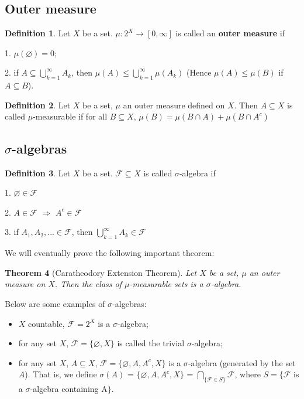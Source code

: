 \documentclass{article}
\newtheorem{theorem}{Theorem}[section]
\theoremstyle{definition}
\newtheorem{definition}[theorem]{Definition}
\begin{document}
\subsection{Outer measure}

\begin{definition}
Let $X$ be a set. $\mu\colon 2^X \longrightarrow [0, \infty]$ is called an {\bf outer measure} if

1. $\mu(\varnothing) = 0$;

2. if $A \subseteq \bigcup_{k=1}^\infty A_k$, then $\mu(A) \leq \bigcup_{k=1}^\infty \mu(A_k)$ (Hence $\mu(A) \leq \mu(B)$ if $A \subseteq B$).
\end{definition}


\begin{definition}
Let $X$ be a set, $\mu$ an outer measure defined on $X$. Then $A \subseteq X$ is called $\mu$-measurable if for all $B \subseteq X$, $\mu(B) = \mu(B \cap A)+\mu(B \cap A^c)$
\end{definition}

\subsection{\texorpdfstring{$\sigma$}{Sigma}-algebras}

\begin{definition}
Let $X$ be a set. $\mathscr{F} \subseteq X$ is called $\sigma$-algebra if 

1. $\varnothing \in \mathscr{F}$

2. $A \in \mathscr{F}$ $\Longrightarrow$ $A^c \in \mathscr{F}$

3. if $A_1, A_2,... \in \mathscr{F}$, then $\bigcup_{k=1}^\infty A_k \in \mathscr{F}$
\end{definition}

We will eventually prove the following important theorem:
\begin{theorem}[Caratheodory Extension Theorem]
Let $X$ be a set, $\mu$ an outer measure on $X$. Then the class of $\mu$-measurable sets is a $\sigma$-algebra.
\end{theorem}


Below are some examples of $\sigma$-algebras:
\begin{itemize}
	\item $X$ countable, $\mathscr{F} = 2^X$ is a $\sigma$-algebra;

    \item for any set $X$, $\mathscr{F} = \{\varnothing, X\}$ is called the trivial $\sigma$-algebra;
    
    \item for any set $X$, $A \subseteq X$, $\mathscr{F} = \{ \varnothing, A, A^c, X\}$ is a $\sigma$-algebra (generated by the set $A$).
    That is, we define $\sigma(A)$ = $\{\varnothing, A, A^c, X\}$ = $\bigcap_{\{\mathscr{F} \in S\}} \mathscr{F}$, where $S = \{$$\mathscr{F}$ is a $\sigma$-algebra containing A$\}$. 
\end{itemize}
\end{document}
